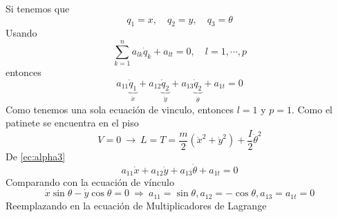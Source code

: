 \documentclass[../main]{subfiles}
\begin{document}
Si tenemos que
\begin{equation*}
    q_1=x,\quad q_2=y,\quad q_3=\theta
\end{equation*}
Usando 
\begin{equation*}
    \sum_{k=1}^n a_{lk}\dot{q}_k+a_{lt}=0,\quad l=1,\cdots,p
\end{equation*}
entonces
\begin{equation*}\tag{$\alpha$}
    a_{11}\underbrace{\dot{q}_1}_{\dot{x}}+a_{12}\underbrace{\dot{q}_2}_{\dot{y}}+a_{13}\underbrace{\dot{q}_2}_{\dot{\theta}}+a_{1t}=0
    \label{ec:alpha3}
\end{equation*}
Como tenemos una sola ecuación de vinculo, entonces $l=1$ y $p=1$. Como el patinete se encuentra en el piso
\begin{equation*}
    V=0 \ \rightarrow \ L=T=\dfrac{m}{2}(\dot{x}^2+\dot{y}^2)+\dfrac{I}{2}\dot{\theta}^2
\end{equation*}
De \eqref{ec:alpha3}
\begin{equation*}
    a_{11}\dot{x}+a_{12}\dot{y}+a_{13}\dot{\theta}+a_{1t}=0
\end{equation*}
Comparando con la ecuación de vínculo
\begin{equation*}
    \dot{x}\sin \theta-\dot{y}\cos \theta=0 \ \Rightarrow \ a_{11}=\sin \theta, a_{12}=-\cos \theta, a_{13}=a_{1t}=0
\end{equation*}
Reemplazando en la ecuación de Multiplicadores de Lagrange
\end{document}
